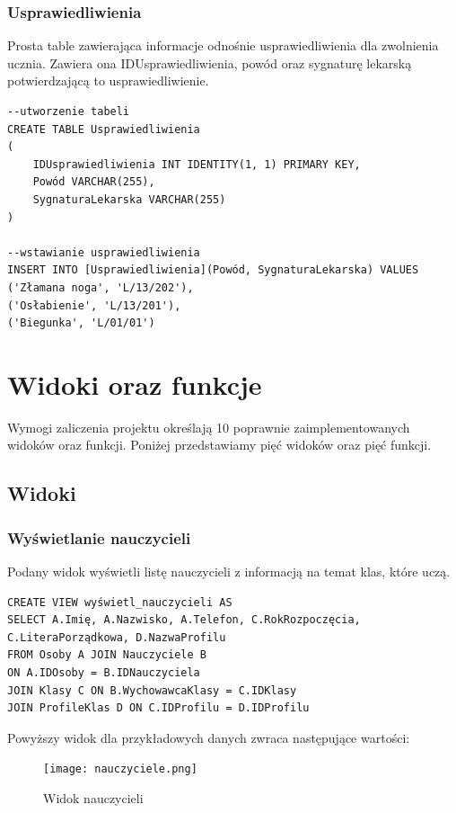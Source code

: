 \documentclass[60pt]{article}
\begin{document}
\subsubsection{Usprawiedliwienia}
Prosta table zawierająca informacje odnośnie usprawiedliwienia dla zwolnienia ucznia. Zawiera ona IDUsprawiedliwienia, powód oraz sygnaturę lekarską potwierdzającą to usprawiedliwienie.

\begin{verbatim}
--utworzenie tabeli
CREATE TABLE Usprawiedliwienia
(
    IDUsprawiedliwienia INT IDENTITY(1, 1) PRIMARY KEY,
    Powód VARCHAR(255),
    SygnaturaLekarska VARCHAR(255)
)

--wstawianie usprawiedliwienia 
INSERT INTO [Usprawiedliwienia](Powód, SygnaturaLekarska) VALUES
('Złamana noga', 'L/13/202'),
('Osłabienie', 'L/13/201'),
('Biegunka', 'L/01/01')
\end{verbatim}

\newpage

\section{Widoki oraz funkcje}

Wymogi zaliczenia projektu określają 10 poprawnie zaimplementowanych widoków oraz funkcji. Poniżej przedstawiamy pięć widoków oraz pięć funkcji.

\subsection{Widoki}

\subsubsection{Wyświetlanie nauczycieli}

Podany widok wyświetli listę nauczycieli z informacją na temat klas, które uczą. 

\begin{verbatim}
CREATE VIEW wyświetl_nauczycieli AS
SELECT A.Imię, A.Nazwisko, A.Telefon, C.RokRozpoczęcia, C.LiteraPorządkowa, D.NazwaProfilu
FROM Osoby A JOIN Nauczyciele B
ON A.IDOsoby = B.IDNauczyciela
JOIN Klasy C ON B.WychowawcaKlasy = C.IDKlasy
JOIN ProfileKlas D ON C.IDProfilu = D.IDProfilu
\end{verbatim}

Powyższy widok dla przykładowych danych zwraca następujące wartości:

\begin{figure}[h]
  \texttt{[image: nauczyciele.png]}
  \caption{Widok nauczycieli}
  \label{Widok nauczycieli}
\end{figure}
\end{document}
